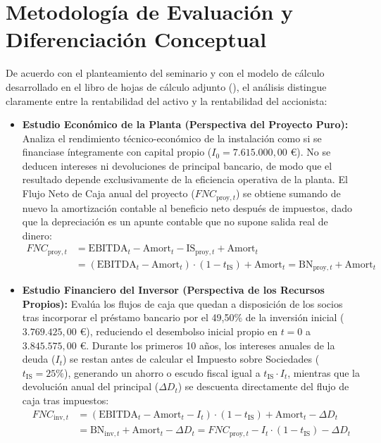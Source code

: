 \documentclass[a4paper,11pt]{report}
\providecommand{\euro}{€}
\begin{document}
\section{Metodología de Evaluación y Diferenciación Conceptual}
De acuerdo con el planteamiento del seminario y con el modelo de cálculo desarrollado en el libro de hojas de cálculo adjunto (), el análisis distingue claramente entre la rentabilidad del activo y la rentabilidad del accionista:
\begin{itemize}
    \item \textbf{Estudio Económico de la Planta (Perspectiva del Proyecto Puro):} Analiza el rendimiento técnico-económico de la instalación como si se financiase íntegramente con capital propio ($I_0 = 7.615.000,00\text{ \euro}$). No se deducen intereses ni devoluciones de principal bancario, de modo que el resultado depende exclusivamente de la eficiencia operativa de la planta. El Flujo Neto de Caja anual del proyecto ($FNC_{\text{proy},t}$) se obtiene sumando de nuevo la amortización contable al beneficio neto después de impuestos, dado que la depreciación es un apunte contable que no supone salida real de dinero:
    \begin{equation}\label{eq:fnc_proyecto}
    \begin{aligned}
        FNC_{\text{proy},t} &= \text{EBITDA}_t - \text{Amort}_t - \text{IS}_{\text{proy},t} + \text{Amort}_t \\
        &= (\text{EBITDA}_t - \text{Amort}_t)\cdot(1 - t_{\text{IS}}) + \text{Amort}_t = \text{BN}_{\text{proy},t} + \text{Amort}_t
    \end{aligned}
    \end{equation}
    \item \textbf{Estudio Financiero del Inversor (Perspectiva de los Recursos Propios):} Evalúa los flujos de caja que quedan a disposición de los socios tras incorporar el préstamo bancario por el 49,50\% de la inversión inicial ($3.769.425,00\text{ \euro}$), reduciendo el desembolso inicial propio en $t=0$ a $3.845.575,00\text{ \euro}$. Durante los primeros 10 años, los intereses anuales de la deuda ($I_t$) se restan antes de calcular el Impuesto sobre Sociedades ($t_{\text{IS}} = 25\%$), generando un ahorro o escudo fiscal igual a $t_{\text{IS}}\cdot I_t$, mientras que la devolución anual del principal ($\Delta D_t$) se descuenta directamente del flujo de caja tras impuestos:
    \begin{equation}\label{eq:fnc_inversor}
    \begin{aligned}
        FNC_{\text{inv},t} &= (\text{EBITDA}_t - \text{Amort}_t - I_t)\cdot(1 - t_{\text{IS}}) + \text{Amort}_t - \Delta D_t \\
        &= \text{BN}_{\text{inv},t} + \text{Amort}_t - \Delta D_t = FNC_{\text{proy},t} - I_t\cdot(1 - t_{\text{IS}}) - \Delta D_t
    \end{aligned}
    \end{equation}
\end{itemize}
\end{document}
